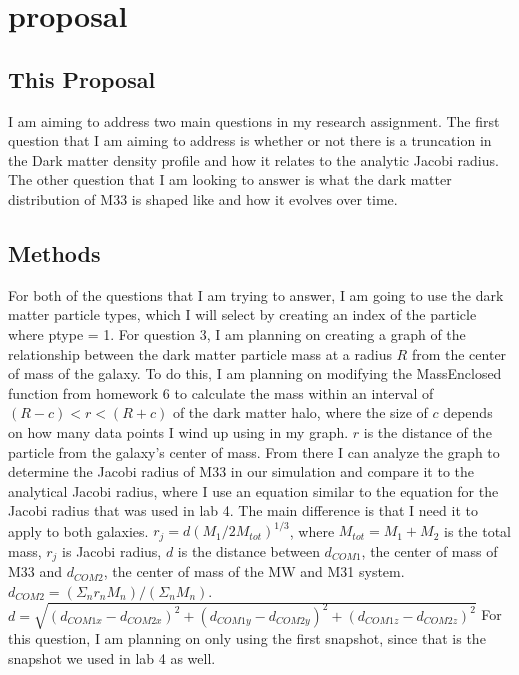 \documentclass[fleqn,usenatbib]{mnras}
\begin{document}
\section {proposal}
\subsection{This Proposal}

I am aiming to address two main questions in my research assignment. The first question that I am aiming to address is whether or not there is a truncation in the Dark matter density profile and how it relates to the analytic Jacobi radius. The other question that I am looking to answer is what the dark matter distribution of M33 is shaped like and how it evolves over time. 

\subsection{Methods}
For both of the questions that I am trying to answer, I am going to use the dark matter particle types, which I will select by creating an index of the particle where ptype = 1. For question 3, I am planning on creating a graph of the relationship between the dark matter particle mass at a radius $R$ from the center of mass of the galaxy. To do this, I am planning on modifying the MassEnclosed function from homework 6 to calculate the mass within an interval of $(R-c) < r < (R+c)$ of the dark matter halo, where the size of $c$ depends on how many data points I wind up using in my graph. $r$ is the distance of the particle from the galaxy's center of mass. From there I can analyze the graph to determine the Jacobi radius of M33 in our simulation and compare it to the analytical Jacobi radius, where I use an equation similar to the equation for the Jacobi radius that was used in lab 4. The main difference is that I need it to apply to both galaxies. $r_j = d(M_1/{2M_{tot}})^{1/3}$, where $M_{tot} = M_{1}+M_{2}$ is the total mass, $r_j$ is Jacobi radius, $d$ is the distance between $d_{COM1}$, the center of mass of M33 and $d_{COM2}$, the center of mass of the MW and M31 system. $d_{COM2} = (\Sigma_nr_nM_n)/(\Sigma_nM_n)$. $d = \sqrt{(d_{COM1x}-d_{COM2x})^2+(d_{COM1y}-d_{COM2y})^2+(d_{COM1z}-d_{COM2z})^2}$ For this question, I am planning on only using the first snapshot, since that is the snapshot we used in lab 4 as well. 
\end{document}
